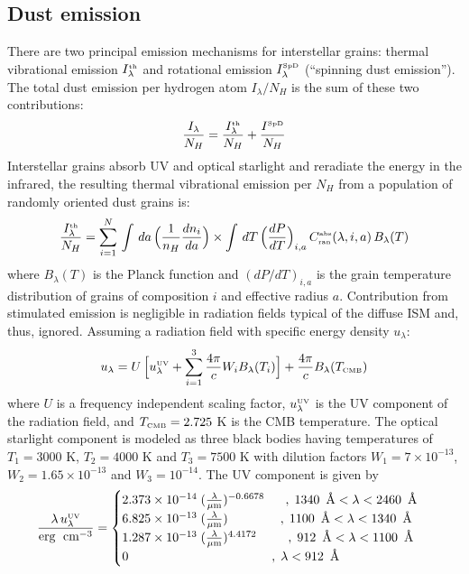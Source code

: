 \subsection{Dust emission}
There are two principal emission mechanisms for interstellar grains: thermal vibrational emission $I^{\text{\tiny{th}}}_\lambda$ and rotational emission $I^{\text{\tiny{SpD}}}_\lambda$ (“spinning dust emission”). The total dust emission per hydrogen atom $I_\lambda /N_H$ is the sum of these two contributions\cite{HenDraine2023}:
\begin{equation}
    \dfrac{I_\lambda}{N_H} = \dfrac{I^{\text{\tiny{th}}}_\lambda}{N_H}  + \dfrac{I^{\text{\tiny{SpD}}}}{N_H}  
\end{equation}
Interstellar grains absorb UV and optical starlight and reradiate the energy in the infrared, the resulting thermal vibrational emission per $N_H$ from a population of randomly oriented dust grains is:
\begin{equation}
    \dfrac{I^{\text{\tiny{th}}}_\lambda}{N_H} =  \sum_{i=1}^N \, \int \,da\,\Big(\frac{1}{n_H}\dfrac{dn_i}{da} \Big) \times \int \,dT\, \Big( \dfrac{dP}{dT}\Big)_{i,a}\,C^{\text{\tiny{abs}}}_{\text{\tiny{ran}}}(\lambda, i, a) \, B_\lambda(T)
\end{equation}
where $B_\lambda(T)$ is the Planck function and $(dP/dT )_{i,a}$ is the grain temperature distribution of grains of composition $i$ and effective radius $a$. Contribution from stimulated emission is negligible in radiation fields typical of the diffuse ISM and, thus, ignored. Assuming\cite{HenDraine2023} a radiation field with specific energy density $u_\lambda$: 
\begin{equation}
    u_\lambda = U \, \Big[ u^{\text{\tiny{UV}}}_\lambda   + \sum_{i=1}^{3} \dfrac{4\pi}{c} W_i B_\lambda(T_i)\Big] + \dfrac{4\pi}{c} B_\lambda(T_{\text{\tiny{CMB}}})
\end{equation}
where $U$ is a frequency independent scaling factor, $u^{\text{\tiny{UV}}}_\lambda $ is the UV component of the radiation field, and $T_{\text{\tiny{CMB}}} =2.725$ K is the CMB temperature. The optical starlight component is modeled as three black bodies having temperatures of $T_1 = 3000$ K, $T_2 = 4000$ K and $T_3 = 7500$ K with dilution factors $W_1 = 7\times10^{-13}$, $W_2 = 1.65\times10^{-13}$ and $W_3 = 10^{-14}$. The UV component is given by
\begin{equation}
     \dfrac{\lambda \, u^{\text{\tiny{UV}}}_\lambda}{\text{erg}\;\text{ cm}^{-3}}  = \begin{cases} 2.373 \times10^{-14}\; (\frac{\lambda}{\mu \text{m}})^{-0.6678} \;\;\;\;\;\; ,\;1340\,\textup{~\AA} <\lambda < 2460\,\textup{~\AA}
    \\  6.825 \times10^{-13}\; (\frac{\lambda}{\mu \text{m}})\;\;\;  \;\;\;\;\;\;\;\;\;\;\;\;,\; 1100\,\textup{~\AA} <\lambda < 1340\,\textup{~\AA}\\ 1.287 \times10^{-13}\; (\frac{\lambda}{\mu \text{m}})^{4.4172} \;\;\;\;\;\;\;\;\;  ,\;912\,\textup{~\AA} <\lambda < 1100\,\textup{~\AA}\\ 0 \;\;\;\;\;\;\;\;\;\;\;\;\;\;\;\;\;\;\;\;\;\;\;\;\;\;\;\;\;\;\;\;\;\;\;\;\;\;\;\;\; ,\;    \lambda <912 \,\textup{~\AA} \end{cases}
\end{equation}
